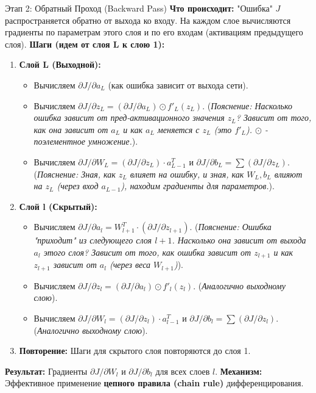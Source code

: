 \begin{myblock}{Этап 2: Обратный Проход (Backward Pass)}
    \textbf{Что происходит:} "Ошибка" $J$ распространяется обратно от выхода ко входу. На каждом слое вычисляются градиенты по параметрам этого слоя и по его входам (активациям предыдущего слоя).
    \textbf{Шаги (идем от слоя L к слою 1):}
    \begin{enumerate}
        \item \textbf{Слой L (Выходной):}
            \begin{itemize}
                \item Вычисляем $\partial J / \partial a_L$ (как ошибка зависит от выхода сети).
                \item Вычисляем $\partial J / \partial z_L = (\partial J / \partial a_L) \odot f'_L(z_L)$. (\textit{Пояснение: Насколько ошибка зависит от пред-активационного значения $z_L$? Зависит от того, как она зависит от $a_L$ и как $a_L$ меняется с $z_L$ (это $f'_L$). $\odot$ - поэлементное умножение.}).
                \item Вычисляем $\partial J / \partial W_L = (\partial J / \partial z_L) \cdot a_{L-1}^T$ и $\partial J / \partial b_L = \sum (\partial J / \partial z_L)$. (\textit{Пояснение: Зная, как $z_L$ влияет на ошибку, и зная, как $W_L, b_L$ влияют на $z_L$ (через вход $a_{L-1}$), находим градиенты для параметров.}).
            \end{itemize}
        \item \textbf{Слой l (Скрытый):}
             \begin{itemize}
                \item Вычисляем $\partial J / \partial a_l = W_{l+1}^T \cdot (\partial J / \partial z_{l+1})$. (\textit{Пояснение: Ошибка "приходит" из следующего слоя $l+1$. Насколько она зависит от выхода $a_l$ этого слоя? Зависит от того, как ошибка зависит от $z_{l+1}$ и как $z_{l+1}$ зависит от $a_l$ (через веса $W_{l+1}$)}).
                \item Вычисляем $\partial J / \partial z_l = (\partial J / \partial a_l) \odot f'_l(z_l)$. (\textit{Аналогично выходному слою}).
                \item Вычисляем $\partial J / \partial W_l = (\partial J / \partial z_l) \cdot a_{l-1}^T$ и $\partial J / \partial b_l = \sum (\partial J / \partial z_l)$. (\textit{Аналогично выходному слою}).
            \end{itemize}
        \item \textbf{Повторение:} Шаги для скрытого слоя повторяются до слоя 1.
    \end{enumerate}
    \textbf{Результат:} Градиенты $\partial J / \partial W_l$ и $\partial J / \partial b_l$ для всех слоев $l$.
    \textbf{Механизм:} Эффективное применение \textbf{цепного правила (chain rule)} дифференцирования.
\end{myblock}

